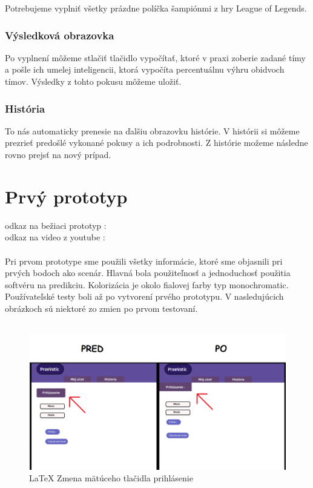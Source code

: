Potrebujeme vyplniť všetky prázdne políčka šampiónmi z hry League of Legends.

\subsubsection{Výsledková obrazovka}

Po vyplnení môžeme stlačiť tlačidlo vypočítať, ktoré v praxi zoberie zadané tímy a pošle ich umelej inteligencii, ktorá vypočíta percentuálnu výhru obidvoch tímov. Výsledky z tohto pokusu môžeme uložiť.

\subsubsection{História}

To nás automaticky prenesie na ďalšiu obrazovku histórie. V histórii si môžeme prezrieť predošlé vykonané pokusy a ich podrobnosti. Z histórie možeme následne rovno prejsť na nový prípad.





\section*{Prvý prototyp}

odkaz na bežiaci prototyp :
\cite{figma}
\\
odkaz na video z youtube :
\cite{youtube}
\\ \\
Pri prvom prototype sme použili všetky informácie, ktoré sme objasnili pri prvých bodoch ako scenár. Hlavná bola použiteľnosť a jednoduchosť použitia softvéru na predikciu. Kolorizácia je okolo fialovej farby typ monochromatic. Používateľské testy boli až po vytvorení prvého prototypu. V nasledujúcich obrázkoch sú niektoré zo zmien po prvom testovaní.
\\ \\



\begin{figure}[h!]
	
	\includegraphics[width=.9\textwidth]{figures/predtym}
	
	\centering
	
	\caption{\LaTeX{} Zmena mätúceho tlačidla prihlásenie\label{predtym}}
	
\end{figure}





